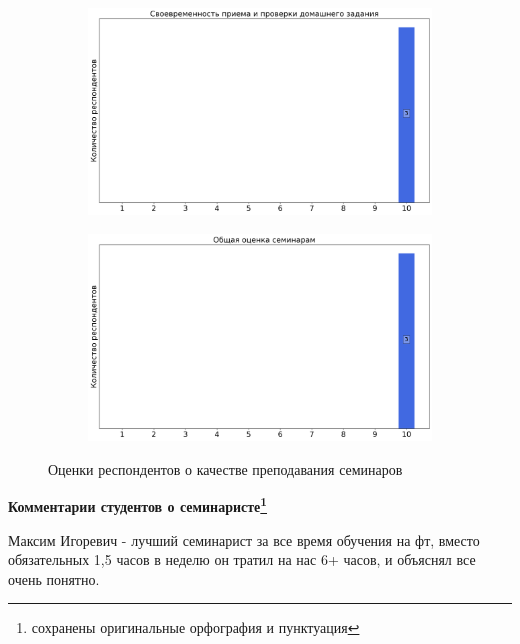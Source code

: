 \begin{figure}[H]
\begin{subfigure}[b]{0.45\textwidth}
				\includegraphics[width=\textwidth]{images/2 course/Общая физика - электричество и магнетизм/seminarists-marks-Пауков М.И.-2.png}
			\end{subfigure}
			\begin{subfigure}[b]{0.45\textwidth}
				\centering
				\includegraphics[width=\textwidth]{images/2 course/Общая физика - электричество и магнетизм/seminarists-marks-Пауков М.И.-3.png}
			\end{subfigure}	
			\caption{Оценки респондентов о качестве преподавания семинаров}
		\end{figure}

		\textbf{Комментарии студентов о семинаристе\protect\footnote{сохранены оригинальные орфография и пунктуация}}
			\begin{commentbox} 
				Максим Игоревич - лучший семинарист за все время обучения на фт, вместо обязательных 1,5 часов в неделю он тратил на нас 6+ часов, и объяснял все очень понятно. 
			\end{commentbox} 

